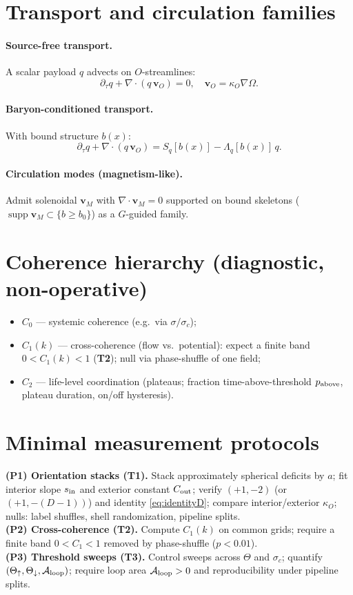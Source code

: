 \documentclass[12pt,a4paper,oneside]{scrreprt}
\begin{document}
\section{Transport and circulation families}\label{sec:ur-families}
\paragraph{Source-free transport.}
A scalar payload $q$ advects on $O$-streamlines:
\[
\partial_{\tau}q+\nabla\!\cdot(q\,\mathbf v_O)=0,\quad \mathbf v_O=\kappa_O\nabla\Omega.
\]
\paragraph{Baryon-conditioned transport.}
With bound structure $b(x)$:
\[
\partial_{\tau}q+\nabla\!\cdot(q\,\mathbf v_O)=S_q[b(x)]-\Lambda_q[b(x)]\,q .
\]
\paragraph{Circulation modes (magnetism-like).}
Admit solenoidal $\mathbf v_M$ with $\nabla\!\cdot\mathbf v_M=0$ supported on bound skeletons ($\operatorname{supp}\mathbf v_M\subset\{b\ge b_0\}$) as a $G$-guided family.

\section{Coherence hierarchy (diagnostic, non-operative)}\label{sec:ur-coherence-hierarchy}
\begin{itemize}
\item $C_0$ — systemic coherence (e.g.\ via $\sigma/\sigma_c$); 
\item $C_1(k)$ — cross-coherence (flow vs.\ potential): expect a finite band $0<C_1(k)<1$ (\textbf{T2}); null via phase-shuffle of one field;
\item $C_2$ — life-level coordination (plateaus; fraction time-above-threshold $p_{\rm above}$, plateau duration, on/off hysteresis).
\end{itemize}

\section{Minimal measurement protocols}\label{sec:ur-protocols}
\textbf{(P1) Orientation stacks (T1).} Stack approximately spherical deficits by $a$; fit interior slope $s_{\rm in}$ and exterior constant $C_{\rm out}$; verify $(+1,-2)$ (or $(+1,-(D\!-\!1))$) and identity \eqref{eq:identityD}; compare interior/exterior $\kappa_O$; nulls: label shuffles, shell randomization, pipeline splits.\\
\textbf{(P2) Cross-coherence (T2).} Compute $C_1(k)$ on common grids; require a finite band $0<C_1<1$ removed by phase-shuffle ($p<0.01$).\\
\textbf{(P3) Threshold sweeps (T3).} Control sweeps across $\Theta$ and $\sigma_c$; quantify $(\Theta_\uparrow,\Theta_\downarrow,\mathcal A_{\rm loop})$; require loop area $\mathcal A_{\rm loop}>0$ and reproducibility under pipeline splits.
\end{document}
